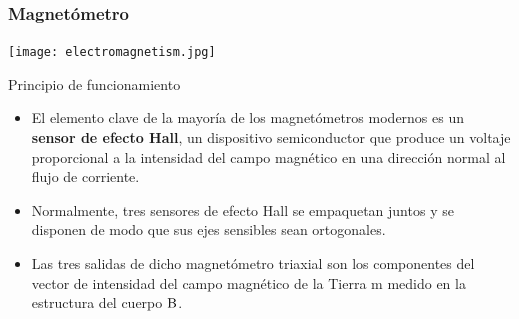 \begin{frame}
    \frametitle{Magnetómetro}
    \scriptsize
    \begin{center}
        \texttt{[image: electromagnetism.jpg]}
    \end{center}

    \begin{block}{Principio de funcionamiento}
        \begin{itemize}
        \item El elemento clave de la mayoría de los magnetómetros modernos es un \textbf{sensor de efecto Hall}, un dispositivo semiconductor que produce un voltaje proporcional a la intensidad del campo magnético en una dirección normal al flujo de corriente.
        \item Normalmente, tres sensores de efecto Hall se empaquetan juntos y se disponen de modo que sus ejes sensibles sean ortogonales.
        \item Las tres salidas de dicho magnetómetro triaxial son los componentes del vector de intensidad del campo magnético de la Tierra m medido en la estructura del cuerpo $\mathrm{B}$.
        \end{itemize}
    \end{block}
\end{frame}

